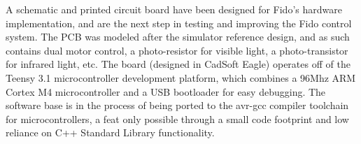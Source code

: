 A schematic and printed circuit board have been designed for Fido's hardware implementation, and are the next step in testing and improving the Fido control system.  The PCB was modeled after the simulator reference design, and as such contains dual motor control, a photo-resistor for visible light, a photo-transistor for infrared light, etc.  The board (designed in CadSoft Eagle) operates off of the Teensy 3.1 microcontroller development platform, which combines a 96Mhz ARM Cortex M4 microcontroller and a USB bootloader for easy debugging.  The software base is in the process of being ported to the avr-gcc compiler toolchain for microcontrollers, a feat only possible through a small code footprint and low reliance on C++ Standard Library functionality.